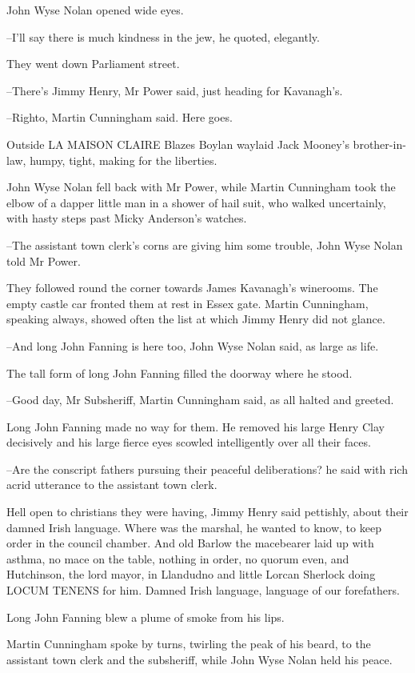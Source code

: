 John Wyse Nolan opened wide eyes.

--I'll say there is much kindness in the jew,
he quoted, elegantly.

They went down Parliament street.

--There's Jimmy Henry,
Mr Power said,
just heading for Kavanagh's.

--Righto,
Martin Cunningham said.
Here goes.

Outside LA MAISON CLAIRE
Blazes Boylan waylaid Jack Mooney's brother-in-
law,
humpy, tight,
making for the liberties.

John Wyse Nolan fell back with Mr Power,
while Martin Cunningham took the
elbow of a dapper little man in a shower of hail suit,
who walked
uncertainly,
with hasty steps past Micky Anderson's watches.

--The assistant town clerk's corns are giving him some trouble,
John Wyse Nolan told Mr Power.%

They followed round the corner
towards James Kavanagh's winerooms.
The
empty castle car fronted them at rest in Essex gate.
Martin Cunningham,
speaking always,
showed often the list at which Jimmy Henry did not
glance.

--And long John Fanning is here too,
John Wyse Nolan said,
as large as
life.

The tall form of long John Fanning
filled the doorway where he stood.

--Good day, Mr Subsheriff,
Martin Cunningham said,
as all halted and greeted.%

Long John Fanning made no way for them.
He removed his large Henry Clay decisively
and his large fierce eyes scowled intelligently over all their faces.

--Are the conscript fathers pursuing their peaceful deliberations?
he said with rich acrid utterance
to the assistant town clerk.

Hell open to christians they were having,
Jimmy Henry said pettishly,
about their damned Irish language.
Where was the marshal,
he wanted to
know,
to keep order in the council chamber.
And old Barlow the macebearer
laid up with asthma,
no mace on the table,
nothing in order,
no quorum even,
and Hutchinson, the lord mayor, in Llandudno
and little Lorcan
Sherlock doing LOCUM TENENS for him.
Damned Irish language,
language of
our forefathers.

Long John Fanning blew a plume of smoke from his lips.

Martin Cunningham spoke by turns,
twirling the peak of his beard,
to the
assistant town clerk and the subsheriff,
while John Wyse Nolan held his
peace.

